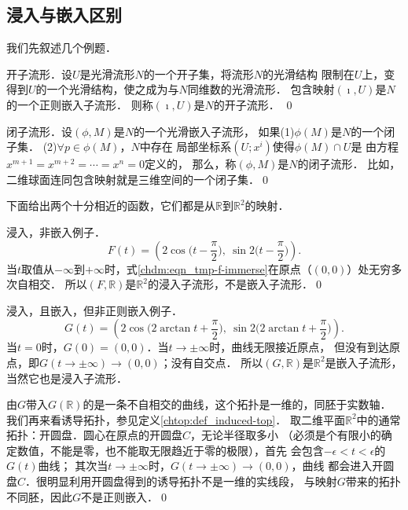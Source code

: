 \subsection{浸入与嵌入区别}
我们先叙述几个例题．
\begin{example}\label{chdm:exm_opensub}
    {\heiti 开子流形}．设$U$是光滑流形$N$的一个开子集，将流形$N$的光滑结构
    限制在$U$上，变得到$U$的一个光滑结构，使之成为与$N$同维数的光滑流形．
    包含映射$(\imath,U)$是$N$的一个正则嵌入子流形．
    则称$(\imath,U)$是$N$的开子流形． \qed
\end{example}

\begin{example}\label{chdm:exm_closesub}
    {\heiti 闭子流形}．设$(\phi,M)$是$N$的一个光滑嵌入子流形，
    如果(1)$\phi(M)$是$N$的一个闭子集． (2)$\forall p\in \phi(M)$，$N$中存在
    局部坐标系$(U;x^i)$使得$\phi(M)\cap U$是
    由方程$x^{m+1}=x^{m+2}=\cdots=x^n=0$定义的，
    那么，称$(\phi,M)$是$N$的闭子流形．
    比如，二维球面连同包含映射就是三维空间的一个闭子集．\qed
\end{example}


下面给出两个十分相近的函数，它们都是从$\mathbb{R}$到$\mathbb{R}^2$的映射．
\begin{example}\label{chdm:exm_iec1}
    浸入，非嵌入例子．  
    \begin{equation}\label{chdm:eqn_tmp-f-immerse}
        F(t)=\left(2\cos\Big(t-\frac{\pi}{2}\Big),\ \sin2\Big(t-\frac{\pi}{2}\Big) \right) .
    \end{equation}
    当$t$取值从$-\infty$到$+\infty$时，式\eqref{chdm:eqn_tmp-f-immerse}在原点（$(0,0)$）处无穷多次自相交．
    所以$(F,\mathbb{R})$是$\mathbb{R}^2$的浸入子流形，不是嵌入子流形．\qed  
\end{example}

\begin{example}\label{chdm:exm_iec2}
    浸入，且嵌入，但非正则嵌入例子．
    \begin{equation}\label{chdm:eqn_tmp-g-embed}
      G(t)=\left(2\cos\Big(2\arctan t+\frac{\pi}{2}\Big),\ \sin2\Big(2 \arctan t+\frac{\pi}{2}\Big) \right) . 
    \end{equation}    
        当$t=0$时，$G(0)=(0,0)$．当$t\to \pm \infty$时，曲线无限接近原点，
    但没有到达原点，即$G(t\to \pm \infty)\to (0,0)$；没有自交点．
    所以$(G,\mathbb{R})$是$\mathbb{R}^2$是嵌入子流形，当然它也是浸入子流形．

    由$G$带入$G(\mathbb{R})$的是一条不自相交的曲线，这个拓扑是一维的，同胚于实数轴．
    我们再来看诱导拓扑，参见定义\ref{chtop:def_induced-top}．
    取二维平面$\mathbb{R}^2$中的通常拓扑：开圆盘．圆心在原点的开圆盘$C$，无论半径取多小
    （必须是个有限小的确定数值，不能是零，也不能取无限趋近于零的极限），首先
    会包含$-\epsilon < t< \epsilon$的$G(t)$曲线；
    其次当$t\to \pm \infty$时，$G(t\to \pm \infty)\to (0,0)$，曲线
    都会进入开圆盘$C$．很明显利用开圆盘得到的诱导拓扑不是一维的实线段，
    与映射$G$带来的拓扑不同胚，因此$G$不是正则嵌入．\qed
\end{example}



